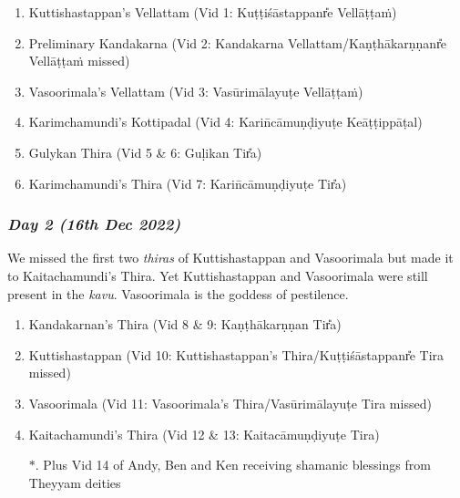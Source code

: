 \documentclass[a4paper, 11pt]{article} %
\begin{document}
\begin{enumerate}
\item Kuttishastappan's Vellattam (Vid 1: Ku\d{t}\d{t}i\'{s}\={a}stappan\U{r}e Vell\={a}\d{t}\d{t}a\.{m}) 
\item Preliminary Kandakarna (Vid 2: Kandakarna Vellattam/Kaṇ\d{t}h\={a}karṇṇan\U{r}e Vell\={a}\d{t}\d{t}a\.{m} missed) 
\item Vasoorimala's Vellattam (Vid 3: Vas\={u}rim\={a}layu\d{t}e Vell\={a}\d{t}\d{t}a\.{m}) 
\item Karimchamundi's Kottipadal (Vid 4: Kari\={n}c\={a}muṇḍiyu\d{t}e Ke\={a}\d{t}\d{t}ipp\={a}\d{t}al) 
\item Gulykan Thira (Vid 5 \& 6: Guḷikan Ti\U{r}a) 
\item Karimchamundi's Thira (Vid 7: Kari\={n}c\={a}muṇḍiyu\d{t}e Ti\U{r}a) 
\end{enumerate}

\subsubsection*{\em Day 2 (16th Dec 2022)}%
  \label{sub:Day 2 (16th Dec 2022)}

We missed the first two \textit{thiras} of Kuttishastappan and Vasoorimala but made it to Kaitachamundi's Thira. 
Yet Kuttishastappan and Vasoorimala were still present in the \textit{kavu}. 
Vasoorimala is the goddess of pestilence.

\begin{enumerate}
\item Kandakarnan's Thira (Vid 8 \& 9: Kaṇ\d{t}h\={a}karṇṇan Ti\U{r}a) 
\item Kuttishastappan (Vid 10: Kuttishastappan's Thira/Ku\d{t}\d{t}i\'{s}\={a}stappan\U{r}e Tira missed) 
\item Vasoorimala (Vid 11: Vasoorimala's Thira/Vas\={u}rim\={a}layu\d{t}e Tira missed) 
\item Kaitachamundi's Thira (Vid 12 \& 13: Kaitac\={a}muṇḍiyu\d{t}e Tira)
\item[$*$.] Plus Vid 14 of Andy, Ben and Ken receiving shamanic blessings from Theyyam deities 
\end{enumerate}
\end{document}
